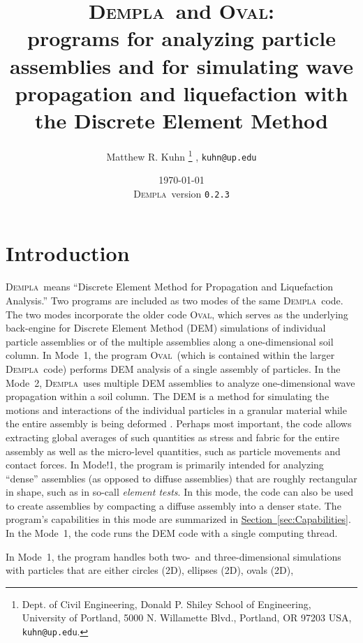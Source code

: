 \documentclass[letterpaper,11pt]{article}
\newcommand{\Oval}{\textsc{Oval}}
\newcommand{\Dempla}{\textsc{Dempla}}
\newcommand{\VersionB}{\texttt{0.2.3}}
\begin{document}
%
\title{\Dempla\ and \Oval:\\programs for analyzing
particle assemblies
and for simulating wave propagation and liquefaction
with the Discrete Element Method}
%
\author{
Matthew R. Kuhn%
\thanks{Dept. of Civil Engineering, Donald P. Shiley School of Engineering,
University of Portland,
5000 N. Willamette Blvd., Portland, OR 97203 USA,
\texttt{kuhn@up.edu}.}%
, \texttt{kuhn@up.edu}%
}
\date{\today\\ \Dempla\ version \VersionB}
%
\maketitle
%
\section{Introduction}
\Dempla\ means ``Discrete Element Method for Propagation
and Liquefaction Analysis.''
Two programs are included as two modes of the same \Dempla\ code.
The two modes incorporate the older code \Oval,
which serves as the underlying back-engine for
Discrete Element Method (DEM) simulations
of individual particle assemblies or of the
multiple assemblies along a one-dimensional
soil column.
In Mode~1,
the program \Oval\ 
(which is contained within the larger \Dempla\ code)
performs DEM analysis of a single assembly of particles.
In the Mode~2,
\Dempla\ uses multiple DEM assemblies to analyze
one-dimensional wave propagation within a soil column.
The DEM is a method for
simulating the motions and interactions of the individual particles
in a granular material while the entire assembly is 
being deformed \citep{Cundall:1979a}.
Perhaps most important, the code allows extracting global averages
of such quantities as stress and fabric for the entire assembly
as well as the micro-level quantities, such as particle movements and contact
forces.
In Mode!1,
the program is primarily intended for analyzing ``dense''
assemblies (as opposed to diffuse assemblies) 
that are roughly rectangular in shape, such as in so-call \emph{element tests}.
In this mode, the code
can also be used to create assemblies by
compacting a diffuse assembly into a denser state.
The program's capabilities in this mode are summarized in
\hyperref[sec:Capabilities]{Section~\ref*{sec:Capabilities}}.
In the Mode~1, the code runs the DEM code with a single
computing thread.
\par
In Mode~1,
the program handles both two-~and three-dimensional simulations
with particles that are either circles (2D), ellipses (2D), ovals (2D),
\end{document}
